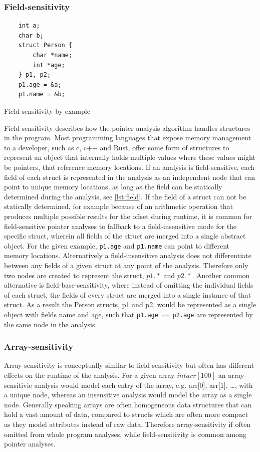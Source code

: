 \subsubsection{Field-sensitivity}

\begin{listing}
    \begin{verbatim}
    int a;
    char b;
    struct Person {
        char *name;
        int *age;
    } p1, p2;
    p1.age = &a;
    p1.name = &b;
        \end{verbatim}
    \caption{Field-sensitivity by example}
    \label{lst:field}
\end{listing}

Field-sensitivity describes how the pointer analysis algorithm handles structures in the program.
Most programming languages that expose memory management to a developer, such as c, c++ and Rust, offer some form of structures to represent an object that internally holds multiple values where these values might be pointers, that reference memory locations.
If an analysis is field-sensitive, each field of each struct is represented in the analysis as an independent node that can point to unique memory locations, as long as the field can be statically determined during the analysis, see \autoref{lst:field}.
If the field of a struct can not be statically determined, for example because of an arithmetic operation that produces multiple possible results for the offset during runtime, it is common for field-sensitive pointer analyses to fallback to a field-insensitive mode for the specific struct, wherein all fields of the struct are merged into a single abstract object.
For the given example, \verb|p1.age| and \verb|p1.name| can point to different memory locations.
Alternatively a field-insensitive analysis does not differentiate between any fields of a given struct at any point of the analysis.
Therefore only two nodes are created to represent the struct, $p1.*$ and $p2.*$.
Another common alternative is field-base-sensitivity, where instead of omitting the individual fields of each struct, the fields of every struct are merged into a single instance of that struct.
As a result the Person structs, p1 and p2, would be represented as a single object with fields name and age, such that \verb|p1.age == p2.age| are represented by the same node in the analysis.

\subsubsection{Array-sensitivity}
Array-sensitivity is conceptually similar to field-sensitivity but often has different effects on the runtime of the analysis.
For a given array $int arr[100]$ an array-sensitivie analysis would model each entry of the array, \newline e.g. arr[0], arr[1], \dots, with a unique node, whereas an insensitive analysis would model the array as a single node.
Generally speaking arrays are often homogeneous data structures that can hold a vast amount of data, compared to structs which are often more compact as they model attributes instead of raw data.
Therefore array-sensitivity if often omitted from whole program analyses, while field-sensitivity is common among pointer analyses.

